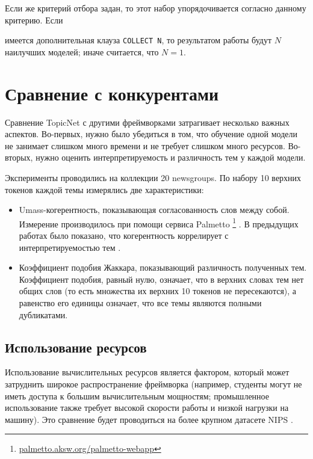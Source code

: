 Если же критерий отбора задан, то этот набор упорядочивается согласно данному критерию. Если

имеется дополнительная клауза \texttt{COLLECT N}, то результатом работы будут $N$ наилучших моделей; иначе считается, что $N=1$.  

\section{Сравнение с конкурентами} 

Сравнение TopicNet с другими фреймворками затрагивает несколько важных аспектов. Во-первых, нужно было убедиться в том, что обучение одной модели не занимает слишком много времени и не требует слишком много ресурсов. Во-вторых, нужно оценить интерпретируемость и различность тем у каждой модели.  

Эксперименты проводились на коллекции 20 newsgroups. По набору 10 верхних токенов каждой темы измерялись две характеристики:

\begin{itemize}

    \item Umass-когерентность, показывающая согласованность слов между собой. Измерение производилось при помощи сервиса Palmetto \footnote{\url{palmetto.aksw.org/palmetto-webapp} } \cite{roder2015exploring}. В предыдущих работах было показано, что когерентность коррелирует с интерпретируемостью тем \cite{mimno2011}.

    \item Коэффициент подобия Жаккара, показывающий различность полученных тем. Коэффициент подобия, равный нулю, означает, что в верхних словах тем нет общих слов (то есть множества их верхних 10 токенов не пересекаются), а равенство его единицы означает, что все темы являются полными дубликатами.

\end{itemize} 

\subsection{Использование ресурсов} 

Использование вычислительных ресурсов является фактором, который может затруднить широкое распространение фреймворка (например, студенты могут не иметь доступа к большим вычислительным мощностям; промышленное  использование также требует высокой скорости работы и низкой нагрузки на машину). Это сравнение будет проводиться на более крупном датасете NIPS \cite{mccallum1996bow}.  

